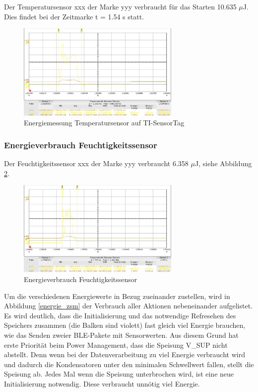 Der Temperatursensor xxx der Marke yyy verbraucht für das Starten 10.635 $\mu$J. Dies findet bei der Zeitmarke t = 1.54 s statt.

\begin{figure}[ht]
  \includegraphics[width=0.7\textwidth]{3Vorgehen/imag/tempSensor.png}
  \caption{Energiemessung Temperatursensor auf TI-SensorTag}
  \label{energie_tempsensor}
\end{figure}

\subsubsection*{Energieverbrauch Feuchtigkeitssensor}

Der Feuchtigkeitssensor xxx der Marke yyy verbraucht 6.358 $\mu$J, siehe Abbildung \ref{energie_humidity}.

\begin{figure}[ht]
  \includegraphics[width=0.7\textwidth]{3Vorgehen/imag/Humidity.png}
  \caption{Energieverbrauch Feuchtigkeitssensor}
  \label{energie_humidity}
\end{figure}

\enlargethispage*{15cm}

\clearpage

Um die verschiedenen Energiewerte in Bezug zueinander zustellen, wird in Abbildung \ref{energie_zsm} der Verbrauch aller Aktionen nebeneinander aufgelistet. Es wird deutlich, dass die Initialisierung und das notwendige Refresehen des Speichers zusammen (die Balken sind violett)  fast gleich viel Energie brauchen, wie das Senden zweier BLE-Pakete mit Sensorwerten. Aus diesem Grund hat erste Priorität beim Power Management, dass die Speisung V\_SUP nicht abstellt. Denn wenn bei der Datenverarbeitung zu viel Energie verbraucht wird und dadurch die Kondensatoren unter den minimalen Schwellwert fallen, stellt die Speisung ab. Jedes Mal wenn die Speisung unterbrochen wird, ist eine neue Initialisierung notwendig. Diese verbraucht unnötig viel Energie.

